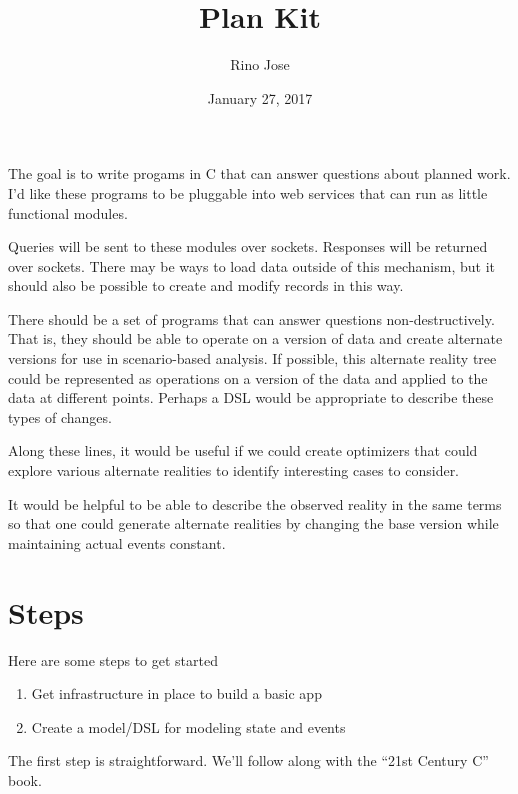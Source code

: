 \documentclass{article}
\title{Plan Kit}
\author{Rino Jose}
\date{January 27, 2017}
\begin{document}
\maketitle

The goal is to write progams in C that can answer questions about planned work.
I'd like these programs to be pluggable into web services that can run as
little functional modules.

Queries will be sent to these modules over sockets. Responses will be returned
over sockets. There may be ways to load data outside of this mechanism, but
it should also be possible to create and modify records in this way.

There should be a set of programs that can answer questions non-destructively.
That is, they should be able to operate on a version of data and create
alternate versions for use in scenario-based analysis. If possible, this
alternate reality tree could be represented as operations on a version of the
data and applied to the data at different points. Perhaps a DSL would be appropriate
to describe these types of changes.

Along these lines, it would be useful if we could create optimizers that could
explore various alternate realities to identify interesting cases to consider.

It would be helpful to be able to describe the observed reality in the same terms
so that one could generate alternate realities by changing the base version while
maintaining actual events constant.

\section{Steps}
Here are some steps to get started

\begin{enumerate}
    \item Get infrastructure in place to build a basic app

    \item Create a model/DSL for modeling state and events
\end{enumerate}

The first step is straightforward. We'll follow along with the ``21st Century C'' book.
\end{document}
